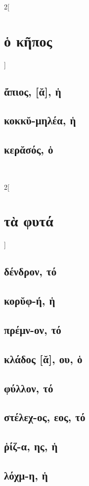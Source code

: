 \documentclass{book}
\begin{document}
\begin{multicols}{2}[\section{ὁ κῆπος}]
\subsection{ἄπιος, [ᾰ], ἡ}
\subsection{κοκκῠ-μηλέα, ἡ}
\subsection{κερᾰσός, ὁ}
\label{56.23}  
~
\end{multicols}
\newpage  
\begin{multicols}{2}[\section{τὰ φυτά}]
\subsection{δένδρον, τό}
\subsection{κορῠφ-ή, ἡ}
\subsection{πρέμν-ον, τό}
\subsection{κλάδος [ᾰ], ου, ὁ}
\subsection{φύλλον, τό}
\subsection{στέλεχ-ος, εος, τό}
\subsection{ῥίζ-α, ης, ἡ}
\subsection{λόχμ-η, ἡ}

\end{multicols}
\end{document}
